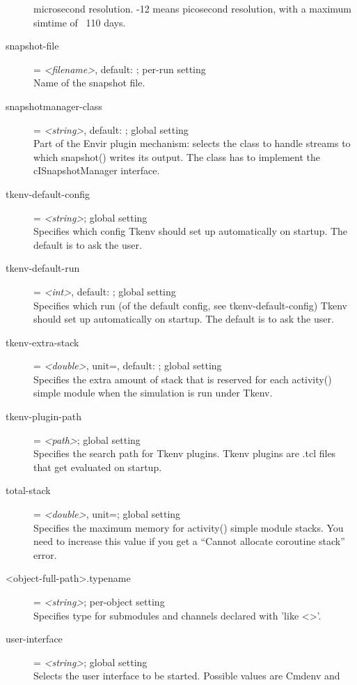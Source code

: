 \begin{description}
    microsecond resolution. -12 means picosecond resolution, with a maximum
    simtime of ~110 days.
\item[snapshot-file] = \textit{<filename>}, default: ; per-run setting \\
    Name of the snapshot file.
\item[snapshotmanager-class] = \textit{<string>}, default: ; global setting \\
    Part of the Envir plugin mechanism: selects the class to handle streams to
    which snapshot() writes its output. The class has to implement the
    cISnapshotManager interface.
\item[tkenv-default-config] = \textit{<string>}; global setting \\
    Specifies which config Tkenv should set up automatically on startup. The
    default is to ask the user.
\item[tkenv-default-run] = \textit{<int>}, default: ; global setting \\
    Specifies which run (of the default config, see tkenv-default-config) Tkenv
    should set up automatically on startup. The default is to ask the user.
\item[tkenv-extra-stack] = \textit{<double>}, unit=, default: ; global setting \\
    Specifies the extra amount of stack that is reserved for each activity()
    simple module when the simulation is run under Tkenv.
\item[tkenv-plugin-path] = \textit{<path>}; global setting \\
    Specifies the search path for Tkenv plugins. Tkenv plugins are .tcl files
    that get evaluated on startup.
\item[total-stack] = \textit{<double>}, unit=; global setting \\
    Specifies the maximum memory for activity() simple module stacks. You need
    to increase this value if you get a ``Cannot allocate coroutine stack''
    error.
\item[<object-full-path>.typename] = \textit{<string>}; per-object setting \\
    Specifies type for submodules and channels declared with 'like <>'.
\item[user-interface] = \textit{<string>}; global setting \\
    Selects the user interface to be started. Possible values are Cmdenv and

\end{description}
